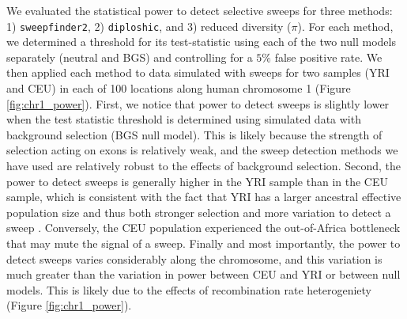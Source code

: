 \documentclass[hidelinks]{article}
\newcommand{\sweepfinder}{\texttt{sweepfinder2}\xspace}
\newcommand{\diploshic}{\texttt{diploshic}\xspace}
\begin{document}
    We evaluated the statistical power to detect selective sweeps for three methods:
    1) \sweepfinder \citep{degiorgio2016sweepfinder2},
    2) \diploshic \citep{kern2018diplos},
    and 3) reduced diversity ($\pi$).
    For each method, we determined a threshold for its test-statistic 
    using each of the two null models separately (neutral and BGS) and controlling 
    for a $5\%$ false positive rate.
    We then applied each method to data simulated with sweeps for two samples (YRI and CEU)
    in each of 100 locations along human chromosome 1 (Figure \ref{fig:chr1_power}).
    First, we notice that power to detect sweeps is slightly lower when the test statistic threshold
    is determined using simulated data with background selection (BGS null model).
    This is likely because the strength of selection acting on exons is relatively weak, and the
    sweep detection methods we have used are relatively robust to the effects of background selection. 
    Second, the power to detect sweeps is generally higher in the YRI sample
    than in the CEU sample, which is consistent with the fact that YRI has a larger ancestral effective population size and
    thus both stronger selection and more variation to detect a sweep \citep[e.g.,][]{simonsen1995properties}.
    Conversely, the CEU population experienced the out-of-Africa bottleneck that may mute the signal of a sweep.  
    Finally and most importantly, the power to detect sweeps varies considerably along the chromosome,
    and this variation is much greater than the variation in power between CEU and YRI or between
    null models. This is likely due to the effects of recombination rate heterogeniety (Figure \ref{fig:chr1_power}).%
\end{document}
